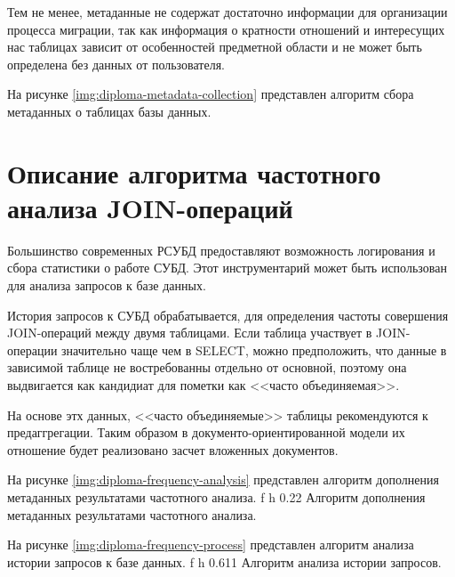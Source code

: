 Тем не менее, метаданные не содержат достаточно информации для организации процесса миграции, 
так как информация о кратности отношений и интересущих нас таблицах зависит от особенностей предметной области
и не может быть определена без данных от пользователя.

На рисунке \ref{img:diploma-metadata-collection} представлен алгоритм сбора метаданных о таблицах базы данных.



\clearpage


\section{Описание алгоритма частотного анализа JOIN-операций}
Большинство современных РСУБД предоставляют возможность логирования и сбора статистики о работе СУБД.
Этот инструментарий может быть использован для анализа запросов к базе данных.

История запросов к СУБД обрабатывается, 
для определения частоты совершения JOIN-операций между двумя таблицами.
Если таблица участвует в JOIN-операции значительно чаще чем в SELECT,
можно предположить, что данные в зависимой таблице не востребованны отдельно от основной, 
поэтому она выдвигается как кандидиат для пометки как <<часто объединяемая>>.

На основе этх данных, <<часто объединяемые>> таблицы рекомендуются к предаггрегации.
Таким образом в документо-ориентированной модели их отношение будет реализовано засчет вложенных документов.

\clearpage

На рисунке \ref{img:diploma-frequency-analysis} представлен алгоритм дополнения метаданных результатами частотного анализа.
    {f}
    {h}
    {0.22\textwidth}
{Алгоритм дополнения метаданных результатами частотного анализа.}

\clearpage
На рисунке \ref{img:diploma-frequency-process} представлен алгоритм анализа истории запросов к базе данных.
    {f}
    {h}
    {0.611\textwidth}
{Алгоритм анализа истории запросов.}

\clearpage

